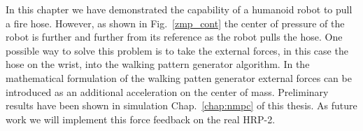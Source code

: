 In this chapter we have demonstrated the capability of a humanoid robot to pull a fire hose.
%
However, as shown in Fig.~\ref{zmp_cont} the center of pressure of the robot is further and further from its reference as the robot pulls the hose.
%
One possible way to solve this problem is to take the external forces, in this case the hose on the wrist, into the walking pattern generator algorithm.
%
In the mathematical formulation of the walking patten generator external forces can be introduced as an additional acceleration on the center of mass.
%
Preliminary results have been shown in simulation Chap.~\ref{chap:nmpc} of this thesis.
As future work we will implement this force feedback on the real HRP-2.
%